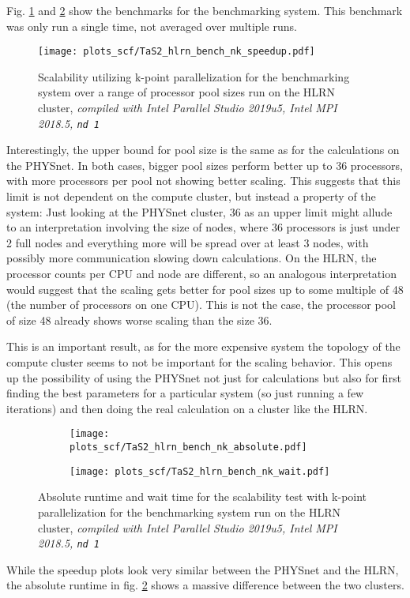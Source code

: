 \documentclass[main.tex]{subfiles}
\begin{document}
Fig. \ref{fig:scaling_scf_hlrn_nk_TaS2_speedup} and \ref{fig:scaling_scf_hlrn_nk_TaS2_absolute_wait} show the benchmarks for the \TaS benchmarking system.
This benchmark was only run a single time, not averaged over multiple runs.

\begin{figure}[ht!]
\centering
\texttt{[image: plots\_scf/TaS2\_hlrn\_bench\_nk\_speedup.pdf]}
\caption{Scalability utilizing k-point parallelization for the \TaS benchmarking system over a range of processor pool sizes run on the HLRN cluster, \emph{\QE compiled with Intel Parallel Studio 2019u5, Intel MPI 2018.5, \texttt{nd 1}}}
\label{fig:scaling_scf_hlrn_nk_TaS2_speedup}
\end{figure}
Interestingly, the upper bound for pool size is the same as for the calculations on the PHYSnet.
In both cases, bigger pool sizes perform better up to 36 processors, with more processors per pool not showing better scaling.
This suggests that this limit is not dependent on the compute cluster, but instead a property of the \TaS system:
Just looking at the PHYSnet cluster, 36 as an upper limit might allude to an interpretation involving the size of nodes, where 36 processors is just under 2 full nodes and everything more will be spread over at least 3 nodes, with possibly more communication slowing down calculations.
On the HLRN, the processor counts per CPU and node are different, so an analogous interpretation would suggest that the scaling gets better for pool sizes up to some multiple of 48 (the number of processors on one CPU).
This is not the case, the processor pool of size 48 already shows worse scaling than the size 36.

This is an important result, as for the more expensive \TaS system the topology of the compute cluster seems to not be important for the scaling behavior.
This opens up the possibility of using the PHYSnet not just for calculations but also for first finding the best parameters for a particular system (so just running a few iterations) and then doing the real calculation on a cluster like the HLRN.

\begin{figure}[ht!]
\begin{subfigure}[b]{0.49\textwidth}
    \centering
    \texttt{[image: plots\_scf/TaS2\_hlrn\_bench\_nk\_absolute.pdf]}
\end{subfigure}
\begin{subfigure}[b]{0.49\textwidth}
    \centering
    \texttt{[image: plots\_scf/TaS2\_hlrn\_bench\_nk\_wait.pdf]}
\end{subfigure}
\caption{Absolute runtime and wait time for the scalability test with k-point parallelization for the \TaS benchmarking system run on the HLRN cluster, \emph{\QE compiled with Intel Parallel Studio 2019u5, Intel MPI 2018.5, \texttt{nd 1}}}
\label{fig:scaling_scf_hlrn_nk_TaS2_absolute_wait}
\end{figure}
While the speedup plots look very similar between the PHYSnet and the HLRN, the absolute runtime in fig. \ref{fig:scaling_scf_hlrn_nk_TaS2_absolute_wait} shows a massive difference between the two clusters.
\end{document}
